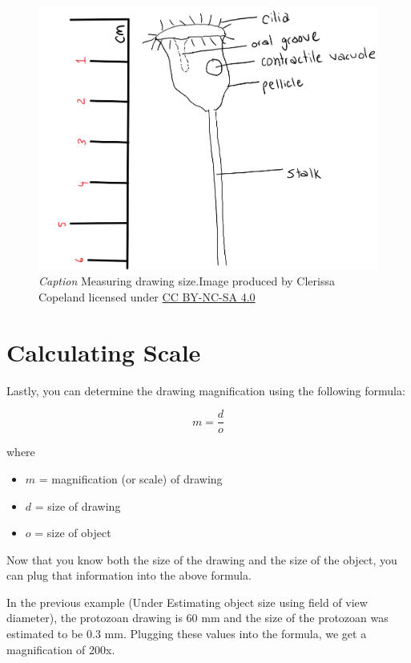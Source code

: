 \documentclass[
]{book}
\providecommand{\tightlist}{%
  \setlength{\itemsep}{0pt}\setlength{\parskip}{0pt}}
\begin{document}
\begin{figure}
\centering
\includegraphics{images/DM_measuring-drawing-size.png}
\caption{\emph{Caption} Measuring drawing size.Image produced by Clerissa Copeland licensed under \href{https://creativecommons.org/licenses/by-nc-sa/4.0/}{CC BY-NC-SA 4.0}}
\end{figure}

\hypertarget{calculating-scale}{%
\section{Calculating Scale}\label{calculating-scale}}

Lastly, you can determine the drawing magnification using the following formula:

\[m = \frac{d}{o}\]

where

\begin{itemize}
\tightlist
\item
  \(m\) = magnification (or scale) of drawing
\item
  \(d\) = size of drawing
\item
  \(o\) = size of object
\end{itemize}

Now that you know both the size of the drawing and the size of the object, you can plug that information into the above formula.

In the previous example (Under Estimating object size using field of view diameter), the protozoan drawing is 60 mm and the size of the protozoan was estimated to be 0.3 mm. Plugging these values into the formula, we get a magnification of 200x.
\end{document}
